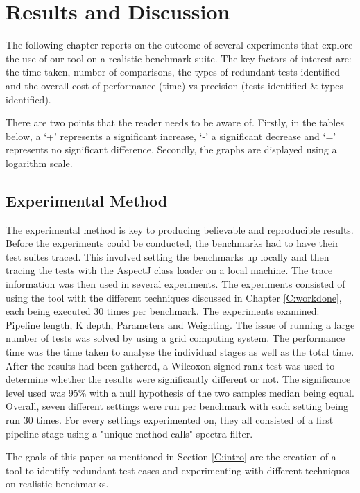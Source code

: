 \chapter{Results and Discussion}\label{C:results}\label{C:evaluation}

The following chapter reports on the outcome of several experiments that explore the use of our tool on a realistic benchmark suite. The key factors of interest are: the time taken, number of comparisons, the types of redundant tests identified and the overall cost of performance (time) vs precision (tests identified \& types identified).

There are two points that the reader needs to be aware of. Firstly, in the tables below, a `+' represents a significant increase, `-' a significant decrease and `=' represents no significant difference. Secondly, the graphs are displayed using a logarithm scale.

\section{Experimental Method}

The experimental method is key to producing believable and reproducible results. Before the experiments could be conducted, the benchmarks had to have their test suites traced. This involved setting the benchmarks up locally and then tracing the tests with the AspectJ class loader on a local machine. The trace information was then used in several experiments. The experiments consisted of using the tool with the different techniques discussed in Chapter \ref{C:workdone}, each being executed 30 times per benchmark. The experiments examined: Pipeline length, K depth, Parameters and Weighting. The issue of running a large number of tests was solved by using a grid computing system. The performance time was the time taken to analyse the individual stages as well as the total time. After the results had been gathered, a Wilcoxon signed rank test \cite{wilcoxon1945individual} was used to determine whether the results were significantly different or not. The significance level used was 95\% with a null hypothesis of the two samples median being equal. Overall, seven different settings were run per benchmark with each setting being run 30 times. For every settings experimented on, they all consisted of a first pipeline stage using a "unique method calls" spectra filter. 

The goals of this paper as mentioned in Section \ref{C:intro} are the creation of a tool to identify redundant test cases and experimenting with different techniques on realistic benchmarks.

